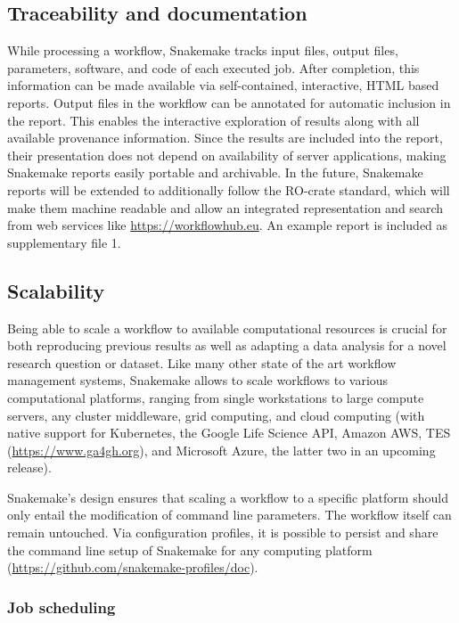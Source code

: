 \documentclass[parskip=half]{scrartcl}
\let\plainurl\url
\renewcommand{\url}[1]{\protect\plainurl{#1}}
\begin{document}
\subsection{Traceability and documentation}

While processing a workflow, Snakemake tracks input files, output files, parameters, software, and code of each executed job.
After completion, this information can be made available via self-contained, interactive, HTML based reports.
Output files in the workflow can be annotated for automatic inclusion in the report.
This enables the interactive exploration of results along with all available provenance information.
Since the results are included into the report, their presentation does not depend on availability of server applications, making Snakemake reports easily portable and archivable.
In the future, Snakemake reports will be extended to additionally follow the RO-crate standard, which will make them machine readable and allow an integrated representation and search from web services like \url{https://workflowhub.eu}.
An example report is included as supplementary file 1.

\subsection{Scalability}\label{sec:scalability}

Being able to scale a workflow to available computational resources is crucial for both reproducing previous results as well as adapting a data analysis for a novel research question or dataset.
Like many other state of the art workflow management systems, Snakemake allows to scale workflows to various computational platforms, ranging from single workstations to large compute servers, any cluster middleware, grid computing, and cloud computing (with native support for Kubernetes, the Google Life Science API, Amazon AWS, TES (\url{https://www.ga4gh.org}), and Microsoft Azure, the latter two in an upcoming release).

Snakemake's design ensures that scaling a workflow to a specific platform should only entail the modification of command line parameters.
The workflow itself can remain untouched.
Via configuration profiles, it is possible to persist and share the command line setup of Snakemake for any computing platform (\url{https://github.com/snakemake-profiles/doc}).

\subsubsection{Job scheduling}\label{sec:scheduling}
\end{document}
